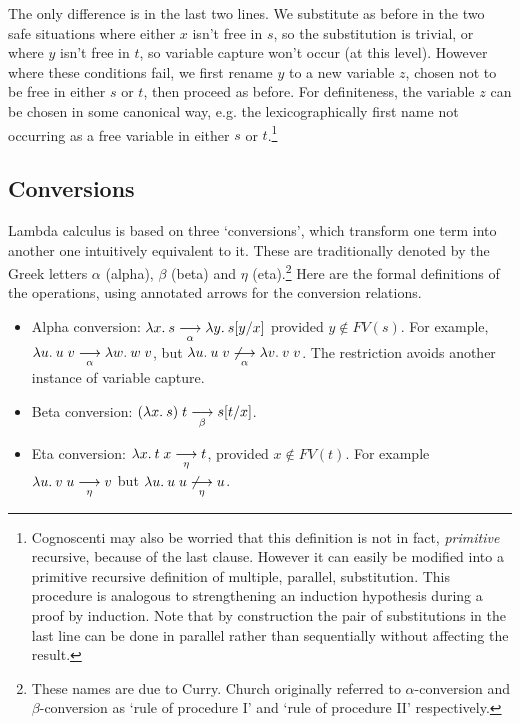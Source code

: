 The only difference is in the last two lines. We substitute as before in the
two safe situations where either $x$ isn't free in $s$, so the substitution is
trivial, or where $y$ isn't free in $t$, so variable capture won't occur (at
this level). However where these conditions fail, we first rename $y$ to a new
variable $z$, chosen not to be free in either $s$ or $t$, then proceed as
before. For definiteness, the variable $z$ can be chosen in some canonical way,
e.g. the lexicographically first name not occurring as a free variable in
either $s$ or $t$.\footnote{Cognoscenti may also be worried that this
definition is not in fact, {\em primitive} recursive, because of the last
clause. However it can easily be modified into a primitive recursive definition
of multiple, parallel, substitution. This procedure is analogous to
strengthening an induction hypothesis during a proof by induction. Note that by
construction the pair of substitutions in the last line can be done in
parallel rather than sequentially without affecting the result.}

\subsection{Conversions}

Lambda calculus is based on three `conversions', which transform one term into
another one intuitively equivalent to it. These are traditionally denoted by
the Greek letters $\alpha$ (alpha), $\beta$ (beta) and $\eta$
(eta).\footnote{These names are due to Curry. Church originally referred to
$\alpha$-conversion and $\beta$-conversion as `rule of procedure I' and `rule
of procedure II' respectively.} Here are the formal definitions of the
operations, using annotated arrows for the conversion relations.

\begin{itemize}

\item Alpha conversion: $\lambda x.\: s \mathrel{\mathop{\longrightarrow}\limits_{\alpha}} \lambda y.\: s[y/x]$ provided $y
\not\in FV(s)$. For example, $\lambda u.\: u\; v \mathrel{\mathop{\longrightarrow}\limits_{\alpha}} \lambda w.\: w\; v$, but
$\lambda u.\: u\; v \not\mathrel{\mathop{\longrightarrow}\limits_{\alpha}} \lambda v.\: v\; v$. The restriction avoids another
instance of variable capture.

\item Beta conversion: $(\lambda x.\: s)\; t \mathrel{\mathop{\longrightarrow}\limits_{\beta}} s[t/x]$.

\item Eta conversion: $\lambda x.\: t\; x \mathrel{\mathop{\longrightarrow}\limits_{\eta}} t$, provided $x \not\in FV(t)$. For
example $\lambda u.\: v\; u \mathrel{\mathop{\longrightarrow}\limits_{\eta}} v$ but $\lambda u.\: u\; u \not\mathrel{\mathop{\longrightarrow}\limits_{\eta}} u$.

\end{itemize}

